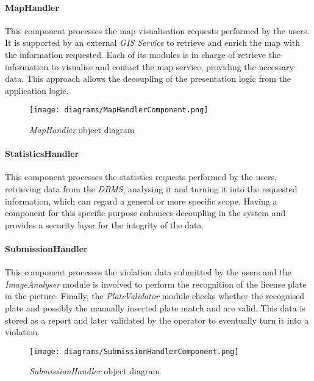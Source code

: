 \paragraph{MapHandler}
This component processes the map visualisation requests performed by the users. It is supported by an external \textit{GIS Service} to retrieve and enrich the map with the information requested. Each of its modules is in charge of retrieve the information to visualise and contact the map service, providing the necessary data. This approach allows the decoupling of the presentation logic from the application logic.\newline\newline
\begin{figure}[h!]
	\centering
	\texttt{[image: diagrams/MapHandlerComponent.png]}
	\caption{
		\label{fig:mapHandlerComponentDiagram} 
		\emph{MapHandler} object diagram
	}
\end{figure}
\paragraph{StatisticsHandler}
This component processes the statistics requests performed by the users, retrieving data from the \textit{DBMS}, analysing it and turning it into the requested information, which can regard a general or more specific scope. Having a component for this specific purpose enhances decoupling in the system and provides a security layer for the integrity of the data.
\paragraph{SubmissionHandler}
This component processes the violation data submitted by the users and the \textit{ImageAnalyser} module is involved to perform the recognition of the license plate in the picture. Finally, the \textit{PlateValidator} module checks whether the recognised plate and possibly the manually inserted plate match and are valid. This data is stored as a report and later validated by the operator to eventually turn it into a violation.\newline\newline
\begin{figure}[h!]
	\centering
	\texttt{[image: diagrams/SubmissionHandlerComponent.png]}
	\caption{
		\label{fig:submissionHandlerComponentDiagram} 
		\emph{SubmissionHandler} object diagram
	}
\end{figure}
